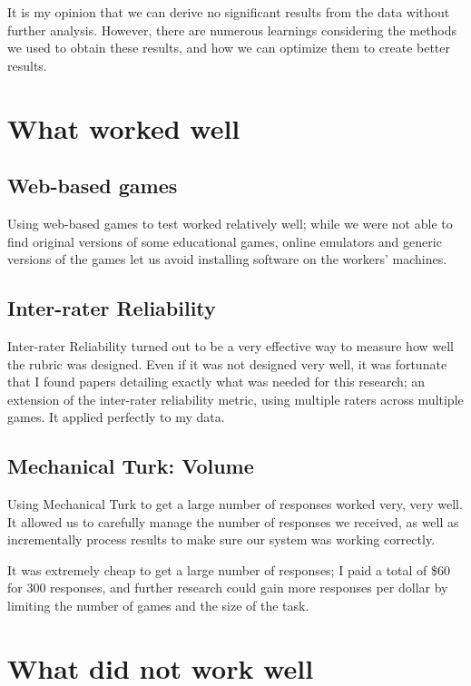 \documentclass[12pt]{report}
\begin{document}
	It is my opinion that we can derive no significant results from the data without further analysis. However, there are numerous learnings considering the methods we used to obtain these results, and how we can optimize them to create better results.

	\section{What worked well}
		
		\subsection{Web-based games}

			Using web-based games to test worked relatively well; while we were not able to find original versions of some educational games, online emulators and generic versions of the games let us avoid installing software on the workers' machines.

		\subsection{Inter-rater Reliability}

			Inter-rater Reliability turned out to be a very effective way to measure how well the rubric was designed. Even if it was not designed very well, it was fortunate that I found papers \cite{interrater1} \cite{interrater2} detailing exactly what was needed for this research; an extension of the inter-rater reliability metric, using multiple raters across multiple games. It applied perfectly to my data.

		\subsection{Mechanical Turk: Volume}

			Using Mechanical Turk to get a large number of responses worked very, very well. It allowed us to carefully manage the number of responses we received, as well as incrementally process results to make sure our system was working correctly. 

			It was extremely cheap to get a large number of responses; I paid a total of \$60 for 300 responses, and further research could gain more responses per dollar by limiting the number of games and the size of the task.


	\section{What did not work well}
\end{document}
